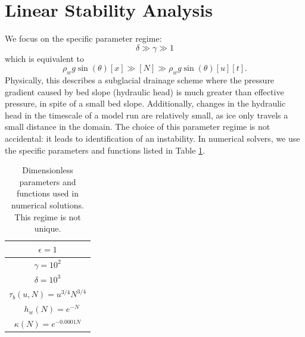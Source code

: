 \documentclass[journal abbreviation, manuscript]{copernicus}
\begin{document}
\section{Linear Stability Analysis} \label{sec: lin_stab_ana}

 We  focus on the specific parameter regime:
$$ \delta \gg \gamma \gg  1 $$  
which is equivalent to
$$ \rho_w g \sin(\theta) [x]  \gg [N] \gg  \rho_w g \sin(\theta) [u][t].   $$ Physically, this describes a subglacial drainage scheme where the pressure gradient caused by bed slope (hydraulic head) is much greater than effective pressure, in spite of a small bed slope. Additionally, changes in the hydraulic head in the timescale of a model run are relatively small, as ice only travels a small distance in the domain. The choice of this parameter regime is not accidental:  it leads to identification of an instability. In numerical solvers, we use the specific parameters and functions listed in Table \ref{tab:params_dimentionless}.

\begin{table}[hb!]
\centering
\begin{tabular}{||c||} 
 \hline
$\epsilon= 1$  \\ 
 \hline
 $\gamma = 10^{2}$ \\
 \hline
$\delta = 10^{3}$ \\
 \hline
 $\tau_b(u,N)= u^{3/4}N^{3/4}$  \\
 \hline
 $\quad h_w(N)= e^{-N}$ \\ 
 \hline
 $\kappa(N)=e^{-0.0001 N}$\\[1ex] 
 \hline
\end{tabular}
\vspace{10pt}
\caption{Dimensionless parameters and functions used in numerical solutions. This regime is not unique.}
\label{tab:params_dimentionless}
\end{table}
\begin{center}
\end{center}
\end{document}
